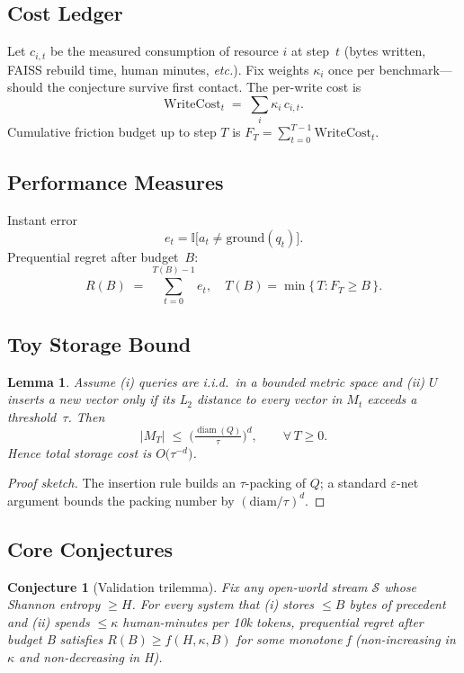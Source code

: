 \documentclass[11pt]{article}
\newtheorem{lemma}{Lemma}
\newcommand{\WriteCost}{\mathrm{WriteCost}}
\begin{document}
\subsection{Cost Ledger}
\label{sec:cost-ledger}

Let $c_{i,t}$ be the measured consumption of resource $i$ at step~$t$
(bytes written, FAISS rebuild time, human minutes, \emph{etc.}).
Fix weights $\kappa_i$ once per benchmark—should the conjecture survive first contact.  The per-write cost is
\[
  \WriteCost_t \;=\; \sum_i \kappa_i\,c_{i,t}.
\]
Cumulative friction budget up to step $T$ is
$F_T = \sum_{t=0}^{T-1}\WriteCost_t$.

\subsection{Performance Measures}
\label{sec:performance-measures}

Instant error
\[
  e_t = \mathbb{I}\bigl[a_t \neq \text{ground}(q_t)\bigr].
\]
Prequential regret after budget~$B$:
\[
  R(B) \;=\; \sum_{t=0}^{T(B)-1} e_t,
  \quad
  T(B) = \min\{\,T : F_T \ge B\,\}.
\]

\subsection{Toy Storage Bound}
\label{sec:toy-storage-bound}

\begin{lemma}
\label{lemma}
Assume (i) queries are i.i.d.\ in a bounded metric space
and (ii)  $U$ inserts a new vector only if its L$_2$ distance to every
vector in $M_t$ exceeds a threshold~$\tau$.  Then
\[
  |M_T| \;\le\;
  \bigl(\tfrac{\operatorname{diam}(Q)}{\tau}\bigr)^{d},
  \qquad
  \forall\,T\ge 0 .
\]
Hence total storage cost is $O\!\bigl(\tau^{-d}\bigr)$.
\end{lemma}

\begin{proof}[Proof sketch]
The insertion rule builds an $\tau$-packing of $Q$; a standard $\varepsilon$-net
argument bounds the packing number by $(\mathrm{diam}/\tau)^d$.
\end{proof}

\subsection{Core Conjectures}
\label{sec:conjectures}

\newtheorem{conjecture}{Conjecture}
\begin{conjecture}[Validation trilemma] \label{conjecture1} Fix any open-world stream \(\mathcal{S}\) whose Shannon entropy \(\geq H\).
For every system that (i) stores \(\leq B\) bytes of precedent
and (ii) spends \(\leq \kappa\) human-minutes per 10k tokens, prequential regret
after budget B satisfies   \( R(B) \geq f(H, \kappa, B) \)   for some monotone f (non-increasing in \(\kappa\) and non-decreasing in H).
\end{conjecture}
\end{document}
